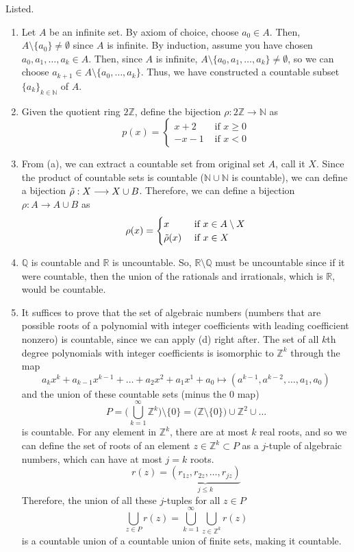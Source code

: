   \begin{solution}
    Listed. 
    \begin{enumerate}
      \item Let $A$ be an infinite set. By axiom of choice, choose $a_0 \in A$. Then, $A \setminus \{a_0\} \neq \emptyset$ since $A$ is infinite. By induction, assume you have chosen $a_0, a_1, \ldots, a_k \in A$. Then, since $A$ is infinite, $A \setminus \{a_0, a_1, \ldots, a_k\} \neq \emptyset$, so we can choose $a_{k+1} \in A \setminus \{a_0, \ldots, a_k\}$. Thus, we have constructed a countable subset $\{a_k\}_{k \in \mathbb{N}}$ of $A$. 
      \item Given the quotient ring $2\mathbb{Z}$, define the bijection $\rho: 2\mathbb{Z} \longrightarrow \mathbb{N}$ as 
      \[p(x) = \begin{cases} 
      x + 2 & \text{ if } x \geq 0 \\
      -x - 1 & \text{ if } x < 0 
      \end{cases}\]
      \item From (a), we can extract a countable set from original set $A$, call it $X$. Since the product of countable sets is countable ($\mathbb{N} \cup \mathbb{N}$ is countable), we can define a bijection $\Tilde{\rho}: X \longrightarrow X \cup B$. Therefore, we can define a bijection $\rho: A \longrightarrow A \cup B$ as 
      \[\rho(x) = \begin{cases} 
      x & \text{ if } x \in A \setminus X \\
      \Tilde{\rho}(x) & \text{ if } x \in X
      \end{cases}\]
      \item $\mathbb{Q}$ is countable and $\mathbb{R}$ is uncountable. So, $\mathbb{R} \setminus \mathbb{Q}$ must be uncountable since if it were countable, then the union of the rationals and irrationals, which is $\mathbb{R}$, would be countable. 
      \item It suffices to prove that the set of algebraic numbers (numbers that are possible roots of a polynomial with integer coefficients with leading coefficient nonzero) is countable, since we can apply (d) right after. The set of all $k$th degree polynomials with integer coefficients is isomorphic to $\mathbb{Z}^k$ through the map 
      \[a_k x^k + a_{k-1} x^{k-1} + \ldots + a_2 x^2 + a_1 x^1 + a_0 \mapsto (a^{k-1}, a^{k-2}, \ldots, a_1, a_0)\]
      and the union of these countable sets (minus the $0$ map) 
      \[P = \bigg(\bigcup_{k = 1}^\infty \mathbb{Z}^k\bigg) \setminus \{0\} = \big(\mathbb{Z} \setminus \{0\}\big) \cup \mathbb{Z}^2 \cup \ldots \]
      is countable. For any element in $\mathbb{Z}^k$, there are at most $k$ real roots, and so we can define the set of roots of an element $z \in \mathbb{Z}^k \subset P$ as a $j$-tuple of algebraic numbers, which can have at most $j=k$ roots. 
      \[r(z) = \underbrace{(r_{1z}, r_{2z}, \ldots, r_{jz})}_{j \leq k}\]
      Therefore, the union of all these $j$-tuples for all $z \in P$ 
      \[\bigcup_{z \in P} r(z) = \bigcup_{k = 1}^\infty \bigcup_{z \in \mathbb{Z}^k} r(z)\]
      is a countable union of a countable union of finite sets, making it countable. 
    \end{enumerate}
  \end{solution}

